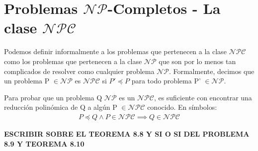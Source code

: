 \documentclass{article}
\begin{document}
\section*{Problemas $\mathcal{NP}$-Completos  -   La clase $\mathcal{NPC}$}
Podemos definir informalmente a los problemas que pertenecen a la clase $\mathcal{NPC}$ como los problemas que pertenecen a la clase $\mathcal{NP}$ que son por lo menos tan complicados de resolver como cualquier problema $\mathcal{NP}$. Formalmente, decimos que un problema P $\in \mathcal{NP}$ es $\mathcal{NPC}$ si $P' \preceq P$ para todo problema P' $\in \mathcal{NP}$.

Para probar que un problema Q $\mathcal{NP}$ es un $\mathcal{NPC}$, es suficiente con encontrar una reducción polinómica de Q a algún P $\in \mathcal{NPC}$ conocido. En símbolos:
\begin{align*}
    P \preceq Q \land P \in \mathcal{NPC} \implies Q\in   \mathcal{NPC}
\end{align*}

\textbf{ESCRIBIR SOBRE EL TEOREMA 8.8 Y SI O SI DEL PROBLEMA 8.9 Y TEOREMA 8.10}
\end{document}
